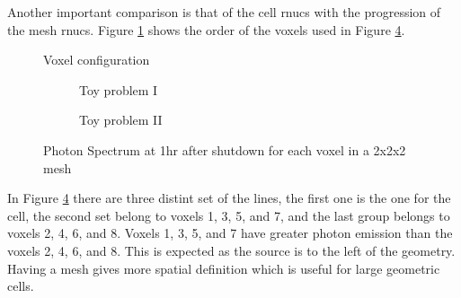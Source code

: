 Another important comparison is that of the cell rnucs with the progression of the mesh rnucs. 
Figure \ref{voxels} shows the order of the voxels used in Figure \ref{spect_cell_2x_byV}. 


\begin{figure}[h]
\begin{centering}
\caption{Voxel configuration}
\label{voxels}
\end{centering}
\end{figure}

\begin{figure}[h]
 \begin{centering}
 \centering
 \begin{subfigure}[b]{.45\textwidth}
 \caption{Toy problem I }
 \label{1spect_cell_2x_byV}
 \end{subfigure}
 \hspace{0.05cm}
 \begin{subfigure}[b]{.45\textwidth}
 \centering
 \caption{Toy problem II}
 \label{2spect_cell_2x_byV}
 \end{subfigure}
 \caption{Photon Spectrum at 1hr after shutdown for each voxel in a 2x2x2 mesh}
 \label{spect_cell_2x_byV}
 \end{centering}
\end{figure}

In Figure \ref{spect_cell_2x_byV} there are three distint set of the lines, the 
first one is the one for the cell, the second set belong to voxels 1, 3, 5, and 7, and the 
last group belongs to voxels 2, 4, 6, and 8. Voxels 1, 3, 5, and 7 have greater photon emission 
than the voxels 2, 4, 6, and 8. This is expected as the source is to the left of the geometry. 
Having a mesh gives more spatial definition which is useful for large geometric cells. 
